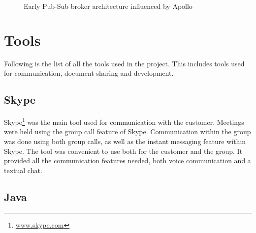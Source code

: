 \begin{center}
  \begin{figure}[ht!]
    \caption{Early Pub-Sub broker architecture influenced by Apollo}
    \label{fig:arch_proposal}
  \end{figure}
\end{center}

\section{Tools}
\label{sec:prestudies-tools}

Following is the list of all the tools used in the project. This includes tools used for communication, document sharing and development.

\subsection{Skype}
\label{subsec:prestudies-tools-skype}

Skype\footnote{\url{www.skype.com}} was the main tool used for communication with the customer. Meetings were held using the group call feature of Skype. Communication within the group was done using both group calls, as well as the instant messaging feature within Skype. The tool was convenient to use both for the customer and the group. It provided all the communication features needed, both voice communication and a textual chat.

\subsection{Java}
\label{subsec:prestudies-tools-java}

